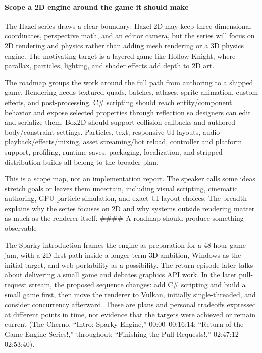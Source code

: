 \paragraph{Scope a 2D engine around the game it should make}\label{scope-a-2d-engine-around-the-game-it-should-make}

The Hazel series draws a clear boundary: Hazel 2D may keep three-dimensional coordinates, perspective math, and an editor camera, but the series will focus on 2D rendering and physics rather than adding mesh rendering or a 3D physics engine. The motivating target is a layered game like Hollow Knight, where parallax, particles, lighting, and shader effects add depth to 2D art.

The roadmap groups the work around the full path from authoring to a shipped game. Rendering needs textured quads, batches, atlases, sprite animation, custom effects, and post-processing. C\# scripting should reach entity/component behavior and expose selected properties through reflection so designers can edit and serialize them. Box2D should support collision callbacks and authored body/constraint settings. Particles, text, responsive UI layouts, audio playback/effects/mixing, asset streaming/hot reload, controller and platform support, profiling, runtime saves, packaging, localization, and stripped distribution builds all belong to the broader plan.

This is a scope map, not an implementation report. The speaker calls some ideas stretch goals or leaves them uncertain, including visual scripting, cinematic authoring, GPU particle simulation, and exact UI layout choices. The breadth explains why the series focuses on 2D and why systems outside rendering matter as much as the renderer itself. \#\#\#\# A roadmap should produce something observable

The Sparky introduction frames the engine as preparation for a 48-hour game jam, with a 2D-first path inside a longer-term 3D ambition, Windows as the initial target, and web portability as a possibility. The return episode later talks about delivering a small game and debates graphics API work. In the later pull-request stream, the proposed sequence changes: add C\# scripting and build a small game first, then move the renderer to Vulkan, initially single-threaded, and consider concurrency afterward. These are plans and personal tradeoffs expressed at different points in time, not evidence that the targets were achieved or remain current (The Cherno, ``Intro: Sparky Engine,'' 00:00--00:16:14; ``Return of the Game Engine Series!,'' throughout; ``Finishing the Pull Requests!,'' 02:47:12--02:53:40).

